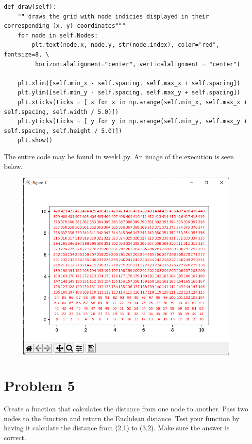 \documentclass{article}
\begin{document}
\begin{verbatim}
def draw(self):
    """draws the grid with node indicies displayed in their corresponding (x, y) coordinates"""
    for node in self.Nodes:
        plt.text(node.x, node.y, str(node.index), color="red", fontsize=8, \
         horizontalalignment="center", verticalalignment = "center")  
    
    plt.xlim([self.min_x - self.spacing, self.max_x + self.spacing])
    plt.ylim([self.min_y - self.spacing, self.max_y + self.spacing])
    plt.xticks(ticks = [ x for x in np.arange(self.min_x, self.max_x + self.spacing, self.width / 5.0)])
    plt.yticks(ticks = [ y for y in np.arange(self.min_y, self.max_y + self.spacing, self.height / 5.0)])
    plt.show()
\end{verbatim}

\newpage
\noindent The entire code may be found in week1.py. An image of the execution is seen below.


\begin{figure}[h]
    \centering
    \includegraphics[width=\textwidth]{question4.png}
\end{figure}

\section*{Problem 5}
 
Create a function that calculates the distance from one node to another. Pass two nodes to the 
function and return the Euclidean distance. Test your function by having it calculate the distance 
from (2,1) to (3,2). Make sure the answer is correct. 
\\\\
\end{document}
